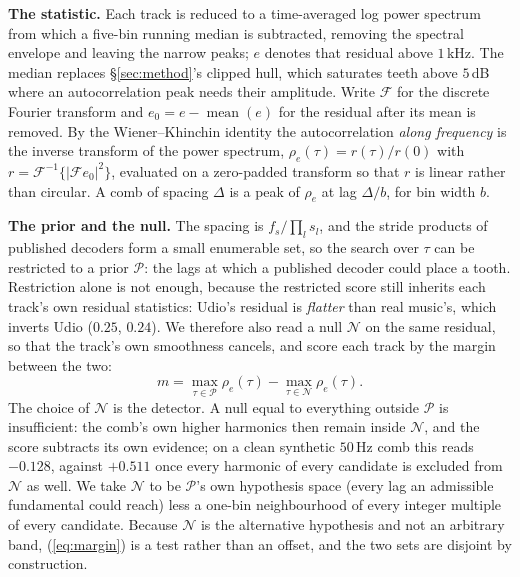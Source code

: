 \documentclass{article}
\begin{document}
\noindent\textbf{The statistic.} Each track is reduced to a time-averaged log power
spectrum from which a five-bin running median is subtracted, removing the spectral
envelope and leaving the narrow peaks; $e$ denotes that residual above $1$\,kHz. The
median replaces \S\ref{sec:method}'s clipped hull, which saturates teeth above
$5$\,dB where an autocorrelation peak needs their amplitude.
Write $\mathcal{F}$ for the discrete Fourier transform and
$e_0 = e - \operatorname{mean}(e)$ for the residual after its mean is removed. By
the Wiener--Khinchin identity \cite{wiener1930harmonic} the autocorrelation
\emph{along frequency} is the inverse transform of the power spectrum,
$\rho_e(\tau) = r(\tau)/r(0)$ with $r = \mathcal{F}^{-1}\{|\mathcal{F}e_0|^{2}\}$,
evaluated on a zero-padded transform so that $r$ is linear rather than circular. A
comb of spacing $\Delta$ is a peak of $\rho_e$ at lag $\Delta/b$, for bin width $b$.

\noindent\textbf{The prior and the null.} The spacing is $f_s/\prod_l s_l$, and the
stride products of published decoders form a small enumerable set, so the search
over $\tau$ can be restricted to a prior $\mathcal{P}$: the lags at which a
published decoder could place a tooth. Restriction alone is not enough, because the
restricted score still inherits each track's own residual statistics: Udio's
residual is \emph{flatter} than real music's, which inverts Udio ($0.25$, $0.24$). We therefore also
read a null $\mathcal{N}$ on the same residual, so that the track's own smoothness
cancels, and score each track by the margin between the two:
\begin{equation}
  m = \max_{\tau \in \mathcal{P}} \rho_e(\tau) - \max_{\tau \in \mathcal{N}} \rho_e(\tau).
  \label{eq:margin}
\end{equation}
The choice of $\mathcal{N}$ is the detector. A null equal to everything outside
$\mathcal{P}$ is insufficient: the comb's own higher harmonics then remain inside
$\mathcal{N}$, and the score subtracts its own evidence; on a clean synthetic
$50$\,Hz comb this reads $-0.128$, against $+0.511$ once every harmonic of every
candidate is excluded from $\mathcal{N}$ as well. We take $\mathcal{N}$ to be
$\mathcal{P}$'s own hypothesis space (every lag an admissible fundamental could
reach) less a one-bin neighbourhood of every integer multiple of every candidate.
Because $\mathcal{N}$ is the alternative hypothesis and not an arbitrary band,
(\ref{eq:margin}) is a test rather than an offset, and the two sets are disjoint by
construction.
\end{document}
